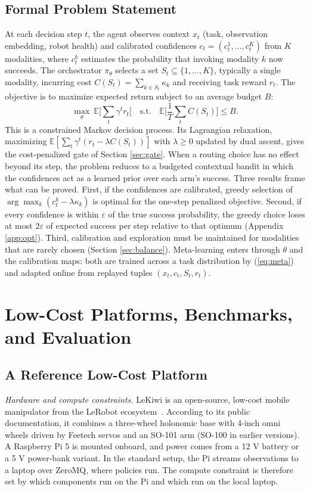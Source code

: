 \documentclass[journal]{IEEEtran}
\begin{document}
\subsection{Formal Problem Statement}\label{sec:formal}
At each decision step $t$, the agent observes context $x_t$ (task, observation embedding, robot health) and calibrated confidences $c_t=(c_t^1,\ldots,c_t^K)$ from $K$ modalities, where $c_t^k$ estimates the probability that invoking modality $k$ now succeeds. The orchestrator $\pi_\theta$ selects a set $S_t\subseteq\{1,\ldots,K\}$, typically a single modality, incurring cost $C(S_t)=\sum_{k\in S_t}\kappa_k$ and receiving task reward $r_t$. The objective is to maximize expected return subject to an average budget $B$:
\begin{equation}
\max_{\theta}\ \mathbb{E}\Big[\sum_t \gamma^t r_t\Big] \quad \text{s.t.} \quad \mathbb{E}\Big[\frac{1}{T}\sum_t C(S_t)\Big] \le B.\label{eq:cmdp}
\end{equation}
This is a constrained Markov decision process. Its Lagrangian relaxation, maximizing $\mathbb{E}[\sum_t\gamma^t(r_t-\lambda C(S_t))]$ with $\lambda\ge 0$ updated by dual ascent, gives the cost-penalized gate of Section \ref{sec:gate}. When a routing choice has no effect beyond its step, the problem reduces to a budgeted contextual bandit in which the confidences act as a learned prior over each arm's success. Three results frame what can be proved. First, if the confidences are calibrated, greedy selection of $\arg\max_k(c_t^k-\lambda\kappa_k)$ is optimal for the one-step penalized objective. Second, if every confidence is within $\varepsilon$ of the true success probability, the greedy choice loses at most $2\varepsilon$ of expected success per step relative to that optimum (Appendix \ref{app:opt}). Third, calibration and exploration must be maintained for modalities that are rarely chosen (Section \ref{sec:balance}). Meta-learning enters through $\theta$ and the calibration maps: both are trained across a task distribution by (\ref{eq:meta}) and adapted online from replayed tuples $(x_t,c_t,S_t,r_t)$.


\section{Low-Cost Platforms, Benchmarks, and Evaluation}\label{sec:platforms}

\subsection{A Reference Low-Cost Platform}\label{sec:lekiwi}
\textit{Hardware and compute constraints.} LeKiwi is an open-source, low-cost mobile manipulator from the LeRobot ecosystem~\cite{Cadene2026,Cadene2024}. According to its public documentation, it combines a three-wheel holonomic base with 4-inch omni wheels driven by Feetech servos and an SO-101 arm (SO-100 in earlier versions). A Raspberry Pi 5 is mounted onboard, and power comes from a 12 V battery or a 5 V power-bank variant. In the standard setup, the Pi streams observations to a laptop over ZeroMQ, where policies run. The compute constraint is therefore set by which components run on the Pi and which run on the local laptop.
\end{document}
